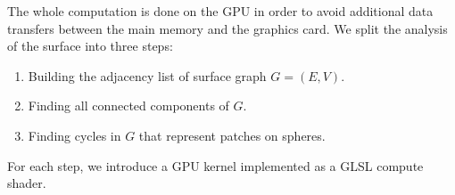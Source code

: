 
The whole computation is done on the GPU in order to avoid additional data transfers between the main memory and the graphics card.
We split the analysis of the surface into three steps:

\begin{enumerate}
  \item Building the adjacency list of surface graph $G = (E, V)$.
	\item Finding all connected components of $G$.
	\item Finding cycles in $G$ that represent patches on spheres.
\end{enumerate}

For each step, we introduce a GPU kernel implemented as a GLSL compute shader.

